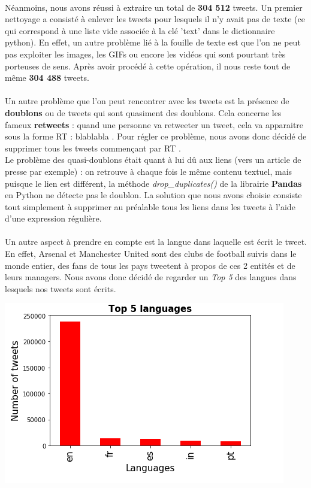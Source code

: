 \documentclass[14pt, openany]{article}
\begin{document}
\paragraph{}
Néanmoins, nous avons réussi à extraire un total de \textbf{304 512} tweets. Un premier nettoyage a consisté à enlever les tweets pour lesquels il n'y avait pas de texte (ce qui correspond à une liste vide associée à la clé 'text' dans le dictionnaire python). En effet, un autre problème lié à la fouille de texte est que l'on ne peut pas exploiter les images, les GIFs ou encore les vidéos qui sont pourtant très porteuses de sens. Après avoir procédé à cette opération, il nous reste tout de même \textbf{304 488} tweets.
\paragraph{}
Un autre problème que l'on peut rencontrer avec les tweets est la présence de \textbf{doublons} ou de tweets qui sont quasiment des doublons. Cela concerne les fameux \textbf{retweets} : quand une personne va retweeter un tweet, cela va apparaitre sous la forme \og RT : blablabla \fg{}. Pour régler ce problème, nous avons donc décidé de supprimer tous les tweets commençant par \og RT \fg{}.\\
Le problème des \og quasi-doublons \fg{} était quant à lui dû aux liens (vers un article de presse par exemple) : on retrouve à chaque fois le même contenu textuel, mais puisque le lien est différent, la méthode \textit{drop\_duplicates()} de la librairie \textbf{Pandas} en Python ne détecte pas le doublon. La solution que nous avons choisie consiste tout simplement à supprimer au préalable tous les liens dans les tweets à l'aide d'une expression régulière.
\paragraph{}
Un autre aspect à prendre en compte est la langue dans laquelle est écrit le tweet. En effet, Arsenal et Manchester United sont des clubs de football suivis dans le monde entier, des fans de tous les pays tweetent à propos de ces 2 entités et de leurs managers. Nous avons donc décidé de regarder un \textit{Top 5} des langues dans lesquels nos tweets sont écrits.\\
\begin{center}
\includegraphics[scale=0.85]{Images/top5.jpg}
\end{center}
\end{document}
